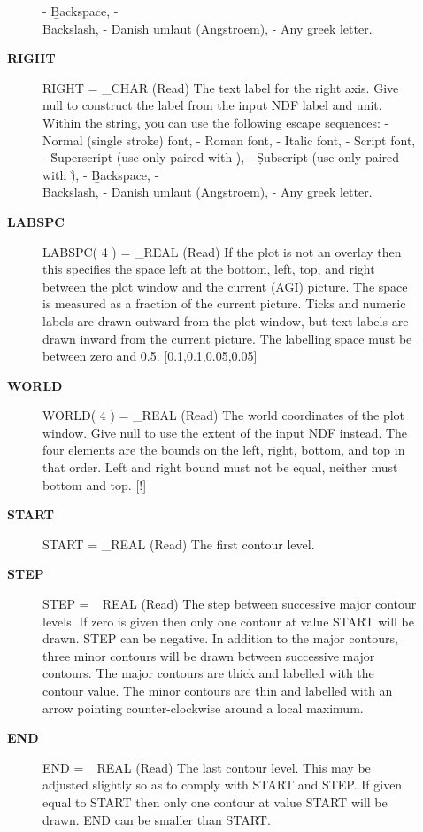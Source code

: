 \begin{description}
\begin{description}
   -  \b  Backspace,
   -  \\  Backslash,
   -  \A  Danish umlaut (Angstroem),
   -  \g  Any greek letter.
\item [{\bf RIGHT}]
RIGHT = _CHAR (Read)
   The text label for the right axis. Give null to construct the
   label from the input NDF label and unit. Within the string,
   you can use the following escape sequences:
   -  \fn Normal (single stroke) font,
   -  \fr Roman font,
   -  \fi Italic font,
   -  \fs Script font,
   -  \u  Superscript (use only paired with \d),
   -  \d  Subscript (use only paired with \u),
   -  \b  Backspace,
   -  \\  Backslash,
   -  \A  Danish umlaut (Angstroem),
   -  \g  Any greek letter.
\item [{\bf LABSPC}]
LABSPC( 4 ) = _REAL (Read)
   If the plot is not an overlay then this specifies the space left
   at the bottom, left, top, and right between the plot window and
   the current (AGI) picture. The space is measured as a fraction
   of the current picture. Ticks and numeric labels are drawn
   outward from the plot window, but text labels are drawn inward
   from the current picture. The labelling space must be between
   zero and 0.5. [0.1,0.1,0.05,0.05]
\item [{\bf WORLD}]
WORLD( 4 ) = _REAL (Read)
   The world coordinates of the plot window. Give null to use the
   extent of the input NDF instead. The four elements are the
   bounds on the left, right, bottom, and top in that order. Left
   and right bound must not be equal, neither must bottom and top.
   [!]
\item [{\bf START}]
START = _REAL (Read)
   The first contour level.
\item [{\bf STEP}]
STEP = _REAL (Read)
   The step between successive major contour levels. If zero is given
   then only one contour at value START will be drawn. STEP can be
   negative. In addition to the major contours, three minor contours
   will be drawn between successive major contours. The major contours
   are thick and labelled with the contour value. The minor contours
   are thin and labelled with an arrow pointing counter-clockwise
   around a local maximum.
\item [{\bf END}]
END = _REAL (Read)
   The last contour level. This may be adjusted slightly so as to
   comply with START and STEP. If given equal to START then only
   one contour at value START will be drawn. END can be smaller
   than START.

\end{description}


\end{description}

